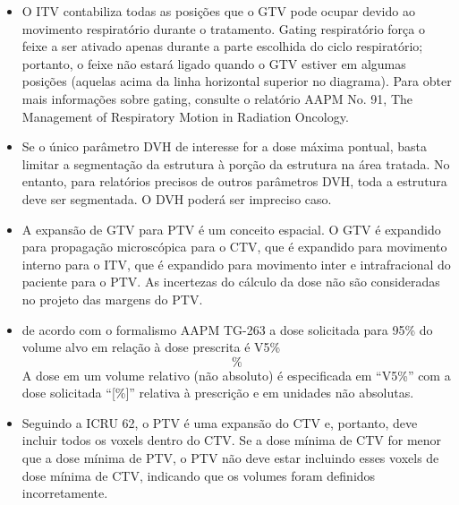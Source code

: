 \documentclass[11pt,a4paper]{article}
\newcounter{exemplo}
\begin{document}
\begin{exemplo}[Medicina]
\begin{itemize}
        \item O ITV contabiliza todas as posições que o GTV pode ocupar devido ao movimento respiratório durante o tratamento. Gating respiratório força o feixe a ser ativado apenas durante a parte escolhida do ciclo respiratório; portanto, o feixe não estará ligado quando o GTV estiver em algumas posições (aquelas acima da linha horizontal superior no diagrama). Para obter mais informações sobre gating, consulte o relatório AAPM No. 91, The Management of Respiratory Motion in Radiation Oncology. 
        
        \item Se o único parâmetro DVH de interesse for a dose máxima pontual, basta limitar a segmentação da estrutura à porção da estrutura na área tratada. No entanto, para relatórios precisos de outros parâmetros DVH, toda a estrutura deve ser segmentada. O DVH poderá ser impreciso caso.
        
        \item A expansão de GTV para PTV é um conceito espacial. O GTV é expandido para propagação microscópica para o CTV, que é expandido para movimento interno para o ITV, que é expandido para movimento inter e intrafracional do paciente para o PTV. As incertezas do cálculo da dose não são consideradas no projeto das margens do PTV.
        
        \item de acordo com o formalismo  AAPM TG-263 a dose  solicitada para 95\% do volume alvo em relação à dose prescrita é V5\%\[\%\]A dose em um volume relativo (não absoluto) é especificada em “V5\%” com a dose solicitada “[\%]” relativa à prescrição e em unidades não absolutas.
        
        \item Seguindo a ICRU 62, o PTV é uma expansão do CTV e, portanto, deve incluir todos os voxels dentro do CTV. Se a dose mínima de CTV for menor que a dose mínima de PTV, o PTV não deve estar incluindo esses voxels de dose mínima de CTV, indicando que os volumes foram definidos incorretamente.
        
    \end{itemize}
\end{exemplo}


\end{document}
